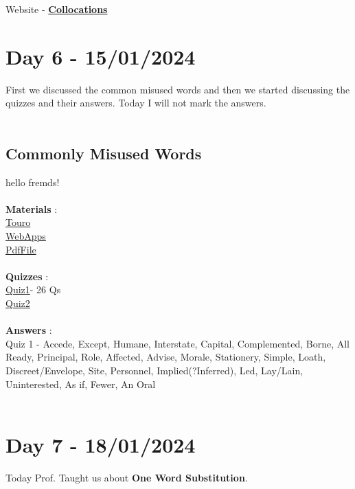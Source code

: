 \documentclass[a4paper,30pt]{report}
\begin{document}
      \par Website - \href{https://englishclub.com/ref/Collocations}{\textbf{Collocations}}\\
  
  \chapter{Day 6 - 15/01/2024}
    First we discussed the common misused words and then we started discussing the quizzes and their answers. Today I will not mark the answers.\\\\ 
    \section{Commonly Misused Words}
     hello fremds! \\\\ 
      \textbf{Materials} :\\
        \href{https://www.touro.edu/departments/writing-center/tutorials/commonly-misused-words/?authuser=1}{Touro}\\
        \href{https://webapps.towson.edu/ows/exercises/posttest2.aspx?authuser=1}{WebApps}\\
        \href{https://drive.google.com/file/d/1-yyI_RZh5uIYTxD-jouX7BSp531Qydqm/view?usp=sharing}{PdfFile}\\\\
      \textbf{Quizzes} : \\
        \href{https://www.niu.edu/writingtutorial/grammar/quizzes/ConfusedWords.htm?authuser=1}{Quiz1}- 26 Qs\\
        \href{https://public.wsu.edu/~campbelld/amlit/quiz/usage.htm?authuser=1}{Quiz2}\\\\
      \textbf{Answers} : \\
        Quiz 1 - Accede, Except, Humane, Interstate, Capital, Complemented, Borne, All Ready, Principal, Role, Affected, Advise, Morale, Stationery, Simple, Loath, Discreet/Envelope, Site, Personnel, Implied(?Inferred), Led, Lay/Lain, Uninterested, As if, Fewer, An Oral\\\\
  
  \chapter{Day 7 - 18/01/2024} %
  \label{chap:Day 7 - 18/01/2024}
    Today Prof. Taught us about \textbf{One Word Substitution}.\\\\
\end{document}
